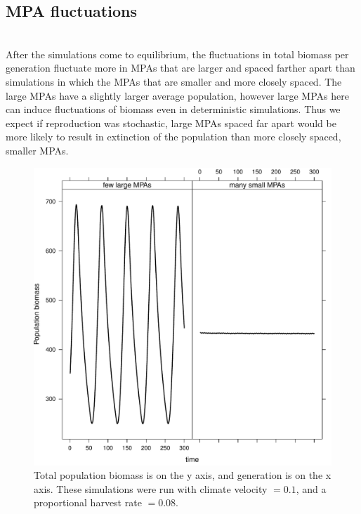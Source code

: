\documentclass[12pt,english]{article}
\begin{document}
\subsection{MPA fluctuations \label{MPA}}
~\\After the simulations come to equilibrium, the fluctuations in total biomass per generation fluctuate more in MPAs that are larger and spaced farther apart than simulations in which the MPAs that are smaller and more closely spaced. The large MPAs have a slightly larger average population, however large MPAs here can induce fluctuations of biomass even in deterministic simulations. Thus we expect if reproduction was stochastic, large MPAs spaced far apart would be more likely to result in extinction of the population than more closely spaced, smaller MPAs. 
\begin{figure}[h]
\centering
\includegraphics[width=.5\textwidth]{plots/bounded_flux.pdf}
\caption{Total population biomass is on the y axis, and generation is on the x axis. These simulations were run with climate velocity $ = 0.1$, and a proportional harvest rate $= 0.08$. }
\end{figure}

\pagebreak

\end{document}
